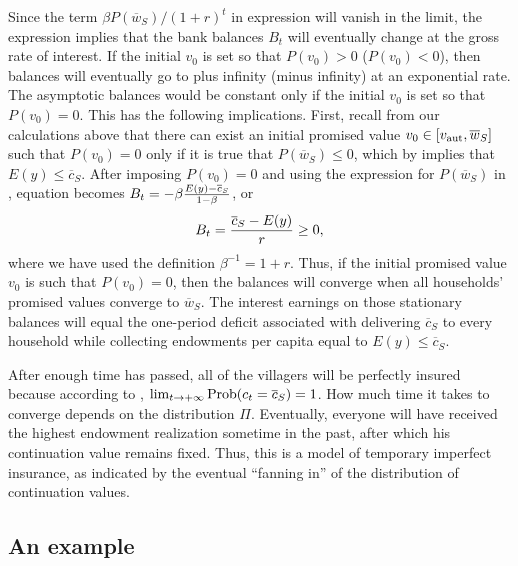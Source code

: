 Since the term $\beta P(\overline w_S)/(1+r)^t$ in expression
 will vanish in the limit, the expression implies
that the bank balances $B_t$ will eventually change at the gross
rate of interest. If the initial $v_0$ is set so that
$P(v_0)>0$ ($P(v_0)<0$), then  balances will eventually go to
plus infinity (minus infinity) at an exponential rate. The
asymptotic balances would  be constant only if the initial $v_0$
is set so that $P(v_0)=0$. This has the following implications. First,
recall from our calculations above that there can  exist an
initial promised value $v_0 \in [v_{\rm aut}, \overline w_S]$ such
that $P(v_0)=0$ only if it is true that $P(\overline w_S) \leq 0$,
which by  implies that $E(y)\leq\overline c_S$.
After imposing $P(v_0)=0$ and using the expression for
$P(\overline w_S)$ in , equation 
becomes $ B_t = - \beta {E(y) - \overline c_S \over 1-\beta}$, or
$$ B_t = {\overline c_S - E(y) \over r} \geq 0,
$$
where we have used the definition $\beta^{-1} = 1+r$. Thus, if the
initial promised value $v_0$ is such that $P(v_0)=0$, then the
balances will converge when all households' promised values
converge to $\overline w_S$. The interest earnings on those
stationary balances will equal  the one-period deficit associated
with delivering $\overline c_S$ to every household while
collecting endowments per capita equal to $E(y) \leq \overline
c_S$.




After enough time has passed, all of the villagers will  be perfectly
insured because according to , $\lim_{t \rightarrow
+\infty} {\rm Prob}(c_t = \overline c_S) =1$.
  How much time it takes to converge depends
on the distribution $\Pi$. Eventually, everyone will have received
the highest endowment realization sometime in the past, after
which his continuation value remains fixed.   Thus, this is a
model of temporary imperfect insurance, as indicated by the
eventual ``fanning in'' of the distribution of continuation values.


\subsection{An example}

